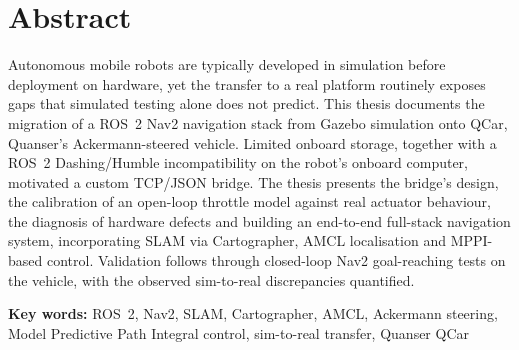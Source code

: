 
\chapter*{Abstract}


Autonomous mobile robots are typically developed in simulation before
deployment on hardware, yet the transfer to a real platform routinely
exposes gaps that simulated testing alone does not predict. This
thesis documents the migration of a ROS~2 Nav2 navigation stack from
Gazebo simulation onto QCar, Quanser's Ackermann-steered vehicle.
Limited onboard storage, together with a ROS~2 Dashing/Humble
incompatibility on the robot's onboard computer, motivated a custom
TCP/JSON bridge. The thesis presents the bridge's design, the
calibration of an open-loop throttle model against real actuator
behaviour, the diagnosis of hardware defects and building an
end-to-end full-stack navigation system, incorporating SLAM via
Cartographer, AMCL localisation and MPPI-based control. Validation
follows through closed-loop Nav2 goal-reaching tests on the vehicle,
with the observed sim-to-real discrepancies quantified.

\vspace{0.5cm}
\noindent\textbf{Key words:} ROS~2, Nav2, SLAM, Cartographer, AMCL,
Ackermann steering, Model Predictive Path Integral control,
sim-to-real transfer, Quanser QCar
